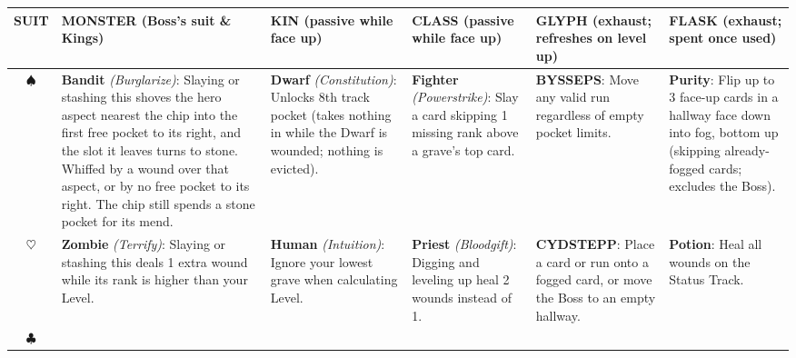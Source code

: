 \documentclass[10pt]{article}
\begin{document}
	\vspace{3pt}
	{\fontsize{7.0}{8.1}\selectfont
		\renewcommand{\arraystretch}{1.08}
		\setlength{\aboverulesep}{1.2pt}
		\setlength{\belowrulesep}{1.4pt}
		\begin{tabularx}{\linewidth}{@{}c@{\hspace{5pt}}*{5}{!{\color{ink!18}\vrule}@{\hspace{5pt}}>{\raggedright\arraybackslash}X@{\hspace{4pt}}}}
			\toprule
			\sffamily\bfseries\scriptsize\color{rust} SUIT &
			{\sffamily\bfseries\scriptsize\color{rust} MONSTER} {\scriptsize\color{faint}(Boss's suit \& Kings)} &
			{\sffamily\bfseries\scriptsize\color{rust} KIN} {\scriptsize\color{faint}(passive while face up)} &
			{\sffamily\bfseries\scriptsize\color{rust} CLASS} {\scriptsize\color{faint}(passive while face up)} &
			{\sffamily\bfseries\scriptsize\color{rust} GLYPH} {\scriptsize\color{faint}(exhaust; refreshes on level up)} &
			{\sffamily\bfseries\scriptsize\color{rust} FLASK} {\scriptsize\color{faint}(exhaust; spent once used)} \\
			\midrule
			{\large\color{ink!65}$\spadesuit$} &
			\textbf{Bandit} \emph{(Burglarize)}: Slaying or stashing this shoves the hero aspect nearest the chip into the first free pocket to its right, and the slot it leaves turns to stone. Whiffed by a wound over that aspect, or by no free pocket to its right. The chip still spends a stone pocket for its mend. &
			\textbf{Dwarf} \emph{(Constitution)}: Unlocks 8th track pocket (takes nothing in while the Dwarf is wounded; nothing is evicted). &
			\textbf{Fighter} \emph{(Powerstrike)}: Slay a card skipping 1 missing rank above a grave's top card. &
			\textbf{BYSSEPS}: Move any valid run regardless of empty pocket limits. &
			\textbf{Purity}: Flip up to 3 face-up cards in a hallway face down into fog, bottom up (skipping already-fogged cards; excludes the Boss). \\
			\midrule
			{\large\color{ink!65}$\heartsuit$} &
			\textbf{Zombie} \emph{(Terrify)}: Slaying or stashing this deals 1 extra wound while its rank is higher than your Level. &
			\textbf{Human} \emph{(Intuition)}: Ignore your lowest grave when calculating Level. &
			\textbf{Priest} \emph{(Bloodgift)}: Digging and leveling up heal 2 wounds instead of 1. &
			\textbf{CYDSTEPP}: Place a card or run onto a fogged card, or move the Boss to an empty hallway. &
			\textbf{Potion}: Heal all wounds on the Status Track. \\
			\midrule
			{\large\color{ink!65}$\clubsuit$} &

\end{tabularx}}
\end{document}
